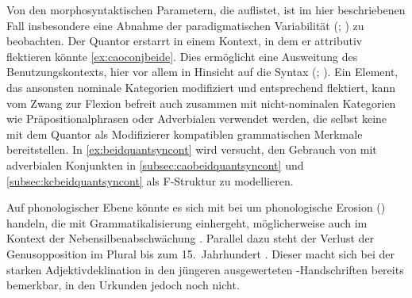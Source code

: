 Von den morphosyntaktischen Parametern, die \citet[174]{lehmann2015} auflistet,
ist im hier beschriebenen Fall insbesondere eine Abnahme der paradigmatischen
Variabilität (; \cite[146--150]{lehmann2015}) zu
beobachten. Der Quantor erstarrt in einem Kontext, in dem er attributiv
flektieren könnte \cref{ex:caoconjbeide}. Dies ermöglicht eine Ausweitung des
Benutzungskontexts, hier vor allem in Hinsicht auf die Syntax (; \cite[150--151]{lehmann2015}). Ein Element, das
ansonsten nominale Kategorien modifiziert und entsprechend flektiert, kann vom
Zwang zur Flexion befreit auch zusammen mit nicht-nominalen Kategorien wie
Präpositionalphrasen oder Adverbialen verwendet werden, die selbst keine mit
dem Quantor als Modifizierer kompatiblen grammatischen Merkmale bereitstellen.
In \cref{ex:beidquantsyncont} wird versucht, den Gebrauch von  mit
adverbialen Konjunkten in \cref{subsec:caobeidquantsyncont} und
\ref{subsec:kcbeidquantsyncont} als F-Struktur zu modellieren.

Auf phonologischer Ebene könnte es sich mit \citet[134--136]{lehmann2015} bei
 um phonologische Erosion () handeln,
die mit Grammatikalisierung einhergeht, möglicherweise auch im Kontext der
Nebensilbenabschwächung \autocite[88--92]{braune2018}. Parallel dazu steht der
Verlust der Genusopposition im Plural bis zum 15.~Jahrhundert
\autocites[203]{paul2007}[191--192]{reichmannwegera1993}. Dieser macht sich bei der
starken Adjektivdeklination in den jüngeren ausgewerteten
\citet{kc}-Handschriften bereits bemerkbar, in den Urkunden jedoch noch
nicht.

